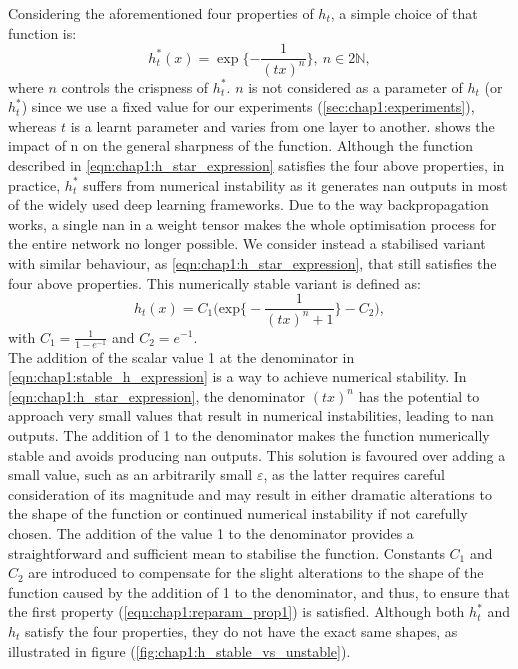 Considering the aforementioned four properties of $h_t$, a simple choice of that
function is:
\begin{equation}
  \label{eqn:chap1:h_star_expression}
  h_t^*(x) = \exp\bigg\{{-\displaystyle\frac{1}{(tx)^n}}\bigg\}, ~ n\in 2\mathds{N},
\end{equation}
\noindent where $n$ controls the crispness of $h_t^*$. $n$ is not considered as
a parameter of $h_t$ (or $h_t^*$) since we use a fixed value for our experiments
(\cref{sec:chap1:experiments}), whereas $t$ is a learnt parameter and varies
from one layer to another.  shows the
impact of n on the general sharpness of the function. Although the function
described in \cref{eqn:chap1:h_star_expression} satisfies the four above
properties, in practice, $h_t^*$ suffers from numerical instability as it
generates \ac{nan} outputs in most of the widely used deep learning frameworks.
Due to the way backpropagation works, a single \ac{nan} in a weight tensor makes
the whole optimisation process for the entire network no longer possible. We
consider instead a stabilised variant with similar behaviour, as
\cref{eqn:chap1:h_star_expression},  that still satisfies the four above
properties. This numerically stable variant is defined as:
\begin{equation}
  \label{eqn:chap1:stable_h_expression}
  h_t(x) = C_1 \biggl( \text{exp} \bigg\{-\displaystyle\frac{1}{(tx)^n +1}\bigg\} - C_2 \biggr),
\end{equation}
\noindent with $C_1=\frac{1}{1-e^{-1}}$ and $C_2 = e^{-1}$.\\

The addition of the scalar value 1 at the denominator in
\cref{eqn:chap1:stable_h_expression} is a way to achieve numerical stability. In
\cref{eqn:chap1:h_star_expression}, the denominator $(tx)^n$ has the potential
to approach very small values that result in numerical instabilities, leading to
\ac{nan} outputs. The addition of 1 to the denominator makes the function
numerically stable and avoids producing \ac{nan} outputs. This solution is
favoured over adding a small value, such as an arbitrarily small $\varepsilon$,
as the latter requires careful consideration of its magnitude and may result in
either dramatic alterations to the shape of the function or continued numerical
instability if not carefully chosen. The addition of the value 1 to the
denominator provides a straightforward and sufficient mean to stabilise the
function. Constants $C_1$ and $C_2$ are introduced to compensate for the slight
alterations to the shape of the function caused by the addition of 1 to the
denominator, and thus, to ensure that the first property
(\cref{eqn:chap1:reparam_prop1}) is satisfied. Although both $h_t^*$ and $h_t$
satisfy the four properties, they do not have the exact same shapes, as
illustrated in figure (\ref{fig:chap1:h_stable_vs_unstable}).\\

